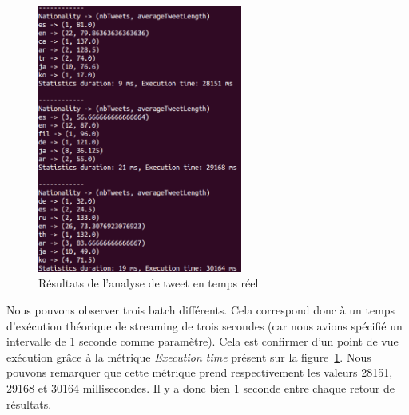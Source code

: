    \begin{figure}
      \centering
      \includegraphics[width=0.6\textwidth]{images/stat_results.png}
      \caption{Résultats de l'analyse de tweet en temps réel}
      \label{fig:resultats_stat_tweet}
    \end{figure}

    Nous pouvons observer trois batch différents. Cela correspond donc à un temps d'exécution théorique de streaming de trois secondes (car nous avions spécifié un intervalle de 1 seconde comme paramètre). Cela est confirmer d'un point de vue exécution grâce à la métrique \emph{Execution time} présent sur la figure~\ref{fig:resultats_stat_tweet}. Nous pouvons remarquer que cette métrique prend respectivement les valeurs 28151, 29168 et 30164 millisecondes. Il y a donc bien 1 seconde entre chaque retour de résultats. \\

